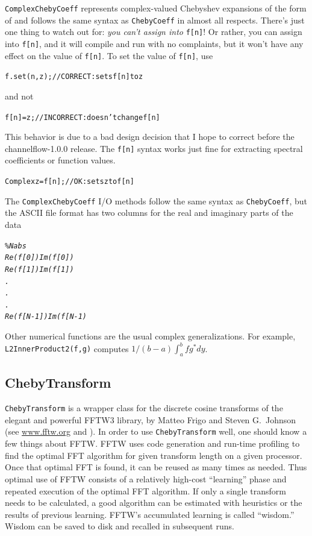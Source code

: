 \documentclass{article}[12pt]
\begin{document}
{\tt ComplexChebyCoeff} represents complex-valued Chebyshev expansions
of the form of  and follows the same syntax as
{\tt ChebyCoeff} in almost all respects. There's just one thing to watch
out for: {\em you can't assign into } {\tt f[n]}! Or rather, you can
assign into {\tt f[n]}, and it will compile and run with no complaints,
but it won't have any effect on the value of {\tt f[n]}. To set the
value of {\tt f[n]}, use
\begin{alltt}
   f.set(n, z);  // CORRECT: sets f[n] to z
\end{alltt}
and not
\begin{alltt}
   f[n] = z;     // INCORRECT: doesn't change f[n]
\end{alltt}
This behavior is due to a bad design decision that I hope to correct
before the channelflow-1.0.0 release. The {\tt f[n]} syntax works just
fine for extracting spectral coefficients or function values.
\begin{alltt}
   Complex z = f[n];  // OK: sets z to f[n]
\end{alltt}


The {\tt ComplexChebyCoeff} I/O methods follow the same syntax as
{\tt ChebyCoeff}, but the ASCII file format has two columns for the real
and imaginary parts of the data
\begin{alltt}
\%{\em N a b s
Re(f[0]) Im(f[0])
Re(f[1]) Im(f[1])
.
.
.
Re(f[N-1]) Im(f[N-1)}
\end{alltt}

Other numerical functions are the usual complex generalizations.
For example, {\tt L2InnerProduct2(f,g)} computes $1/(b-a) \int_a^b f g^* dy$.


\subsection{ChebyTransform}
\label{sec:chebytransform}

{\tt ChebyTransform} is a wrapper class for the discrete cosine transforms
of the elegant and powerful FFTW3 library, by Matteo Frigo and
Steven G.\ Johnson (see \url{www.fftw.org} and \cite{Frigo98}). In order
to use {\tt ChebyTransform} well, one should know a few things about FFTW.
FFTW uses code generation and run-time profiling to find the optimal
FFT algorithm for given transform length on a given processor. Once
that optimal FFT is found, it can be reused as many times as needed.
Thus optimal use of FFTW consists of a relatively high-cost ``learning''
phase and repeated execution of the optimal FFT algorithm. If only a
single transform needs to be calculated, a good algorithm can be estimated
with heuristics or the results of previous learning. FFTW's accumulated
learning is called ``wisdom.'' Wisdom can be saved to disk and recalled
in subsequent runs.
\end{document}
